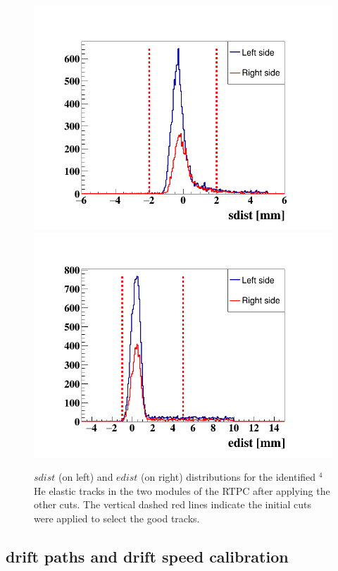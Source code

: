 \begin{figure}[tp]
\includegraphics[scale=0.34]{fig_rtpc/updates/sdist_elastic_1p2GeV.png}
\includegraphics[scale=0.34]{fig_rtpc/updates/edist_elastic_1p2GeV.png}
\caption{ $sdist$ (on left) and $edist$ (on right) distributions for the 
identified $^4$He elastic tracks in the two modules of the RTPC after applying 
the other cuts. The vertical dashed red lines indicate the initial cuts were 
applied to select the good tracks.}
\label{fig:2-sdist-edist}
\end{figure} 




\subsection{drift paths and drift speed calibration}

